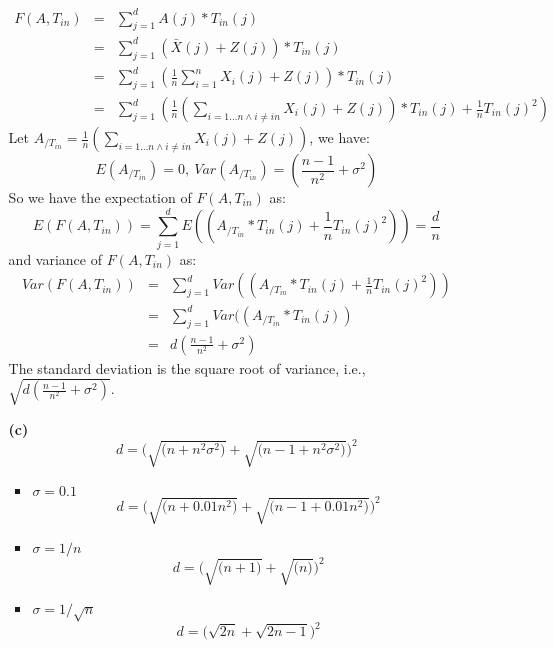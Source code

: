 \documentclass[11pt]{article}
\begin{document}
\begin{enumerate}
\begin{enumerate}
	\[
	\begin{array}{ccl}
	F(A, T_{in}) 
	& = & \sum_{j = 1}^{d}A(j) * T_{in}(j)\\
	& = & \sum_{j = 1}^{d}(\bar{X}(j) + Z(j)) * T_{in}(j)\\
	& = & \sum_{j = 1}^{d}(\frac{1}{n} \sum_{i = 1}^{n}X_i(j) + Z(j)) * T_{in}(j)\\
	& = & \sum_{j = 1}^{d}
	(\frac{1}{n}( \sum\limits_{i = 1\ldots n \land i \neq in}
	X_i(j) + Z(j))* T_{in}(j) + \frac{1}{n}T_{in}(j)^2)
	\end{array}
	\]
	Let $A_{/T_{in}} = \frac{1}{n}( \sum\limits_{i = 1\ldots n \land i \neq in}
	X_i(j) + Z(j))$, we have:
	\[
	E(A_{/T_{in}}) = 0, 
	~ Var(A_{/T_{in}}) = (\frac{n - 1}{n^2} + \sigma^2)
	\]
	So we have the expectation of $F(A, T_{in})$ as:
	\[
	E(F(A, T_{in})) 
	= \sum_{j = 1}^{d}
	E((A_{/T_{in}} * T_{in}(j) + \frac{1}{n}T_{in}(j)^2))
	= \frac{d}{n}
	\]
	and variance of $F(A, T_{in})$ as:
	\[
	\begin{array}{ccl}
	Var(F(A, T_{in})) 
	& = & \sum_{j = 1}^{d}
	Var((A_{/T_{in}} * T_{in}(j) + \frac{1}{n}T_{in}(j)^2))\\
	& = & \sum_{j = 1}^{d}
	Var((A_{/T_{in}} * T_{in}(j))\\
	& = & d(\frac{n - 1}{n^2} + \sigma^2)
	\end{array}
	\]
	The standard deviation is the square root of variance, i.e., $\sqrt{d(\frac{n - 1}{n^2} + \sigma^2)}$.
	\item[\textbf{(c)}]
	\[
	d = 
	\bigg(\sqrt{\big(n + n^2\sigma^2\big)} 
	+ \sqrt{\big(n - 1 + n^2\sigma^2\big)} \bigg)^2
	\]
	\begin{itemize}
		\item $\sigma = 0.1$
		\[
		d = 
		\bigg(\sqrt{\big(n + 0.01n^2\big)} 
		+ \sqrt{\big(n - 1 + 0.01n^2\big)} \bigg)^2
		\]
		\item $\sigma = 1/n$
		\[
		d = 
		\bigg(\sqrt{\big(n + 1\big)} 
		+ \sqrt{\big(n\big)} \bigg)^2
		\]
		\item $\sigma = 1/\sqrt{n}$
		\[
		d = \big(\sqrt{2n} 
		+ \sqrt{2n - 1} \big)^2
		\]
	\end{itemize}
\end{enumerate}


\end{enumerate}
\end{document}
